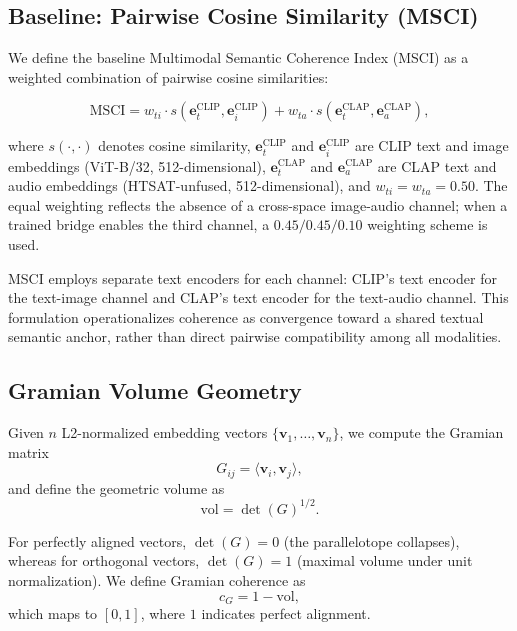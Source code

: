 \documentclass[a4paper,fleqn]{cas-sc}
\begin{document}

\begin{itemize}
\subsection{Baseline: Pairwise Cosine Similarity (MSCI)}

We define the baseline Multimodal Semantic Coherence Index (MSCI) as a weighted combination of pairwise cosine similarities:

\begin{equation}
\text{MSCI} =
w_{ti} \cdot s\!\left(\mathbf{e}_t^{\text{CLIP}}, \mathbf{e}_i^{\text{CLIP}}\right)
+
w_{ta} \cdot s\!\left(\mathbf{e}_t^{\text{CLAP}}, \mathbf{e}_a^{\text{CLAP}}\right),
\end{equation}

where $s(\cdot,\cdot)$ denotes cosine similarity, $\mathbf{e}_t^{\text{CLIP}}$ and $\mathbf{e}_i^{\text{CLIP}}$ are CLIP text and image embeddings (ViT-B/32, 512-dimensional), $\mathbf{e}_t^{\text{CLAP}}$ and $\mathbf{e}_a^{\text{CLAP}}$ are CLAP text and audio embeddings (HTSAT-unfused, 512-dimensional), and $w_{ti} = w_{ta} = 0.50$. The equal weighting reflects the absence of a cross-space image-audio channel; when a trained bridge enables the third channel, a $0.45/0.45/0.10$ weighting scheme is used.

MSCI employs separate text encoders for each channel: CLIP's text encoder for the text-image channel and CLAP's text encoder for the text-audio channel. This formulation operationalizes coherence as convergence toward a shared textual semantic anchor, rather than direct pairwise compatibility among all modalities.

\subsection{Gramian Volume Geometry}

Given $n$ L2-normalized embedding vectors $\{\mathbf{v}_1, \ldots, \mathbf{v}_n\}$, we compute the Gramian matrix
\begin{equation}
G_{ij} = \langle \mathbf{v}_i, \mathbf{v}_j \rangle,
\end{equation}
and define the geometric volume as
\begin{equation}
\text{vol} = \det(G)^{1/2}.
\end{equation}

For perfectly aligned vectors, $\det(G)=0$ (the parallelotope collapses), whereas for orthogonal vectors, $\det(G)=1$ (maximal volume under unit normalization). We define Gramian coherence as
\begin{equation}
c_G = 1 - \text{vol},
\end{equation}
which maps to $[0,1]$, where $1$ indicates perfect alignment.


\end{itemize}
\end{document}
